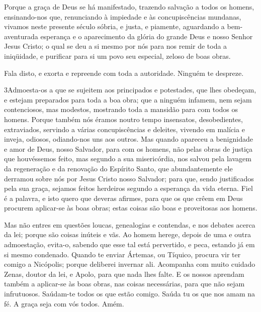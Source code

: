 Porque a graça de Deus se há manifestado, trazendo salvação a
todos os homens, ensinando-nos que, renunciando à impiedade e
às concupiscências mundanas, vivamos neste presente século sóbria, e
justa, e piamente, aguardando a bem-aventurada esperança e o
aparecimento da glória do grande Deus e nosso Senhor Jesus Cristo;
o qual se deu a si mesmo por nós para nos remir de toda a
iniqüidade, e purificar para si um povo seu especial, zeloso de boas
obras.

Fala disto, e exorta e repreende com toda a autoridade. Ninguém
te despreze.

\medskip

\lettrine{3} Admoesta-os a que se sujeitem aos principados e
potestades, que lhes obedeçam, e estejam preparados para toda a boa
obra; que a ninguém infamem, nem sejam contenciosos, mas
modestos, mostrando toda a mansidão para com todos os homens.
Porque também nós éramos noutro tempo insensatos, desobedientes,
extraviados, servindo a várias concupiscências e deleites, vivendo
em malícia e inveja, odiosos, odiando-nos uns aos outros. Mas
quando apareceu a benignidade e amor de Deus, nosso Salvador, para
com os homens, não pelas obras de justiça que houvéssemos feito,
mas segundo a sua misericórdia, nos salvou pela lavagem da
regeneração e da renovação do Espírito Santo, que abundantemente
ele derramou sobre nós por Jesus Cristo nosso Salvador; para
que, sendo justificados pela sua graça, sejamos feitos herdeiros
segundo a esperança da vida eterna. Fiel é a palavra, e isto
quero que deveras afirmes, para que os que crêem em Deus procurem
aplicar-se às boas obras; estas coisas são boas e proveitosas aos
homens.

Mas não entres em questões loucas, genealogias e contendas, e nos
debates acerca da lei; porque são coisas inúteis e vãs. Ao
homem herege, depois de uma e outra admoestação, evita-o,
sabendo que esse tal está pervertido, e peca, estando já em
si mesmo condenado. Quando te enviar Ártemas, ou Tíquico,
procura vir ter comigo a Nicópolis; porque deliberei invernar ali.
Acompanha com muito cuidado Zenas, doutor da lei, e Apolo,
para que nada lhes falte. E os nossos aprendam também a
aplicar-se às boas obras, nas coisas necessárias, para que não sejam
infrutuosos. Saúdam-te todos os que estão comigo. Saúda tu os
que nos amam na fé. A graça seja com vós todos. Amém.

